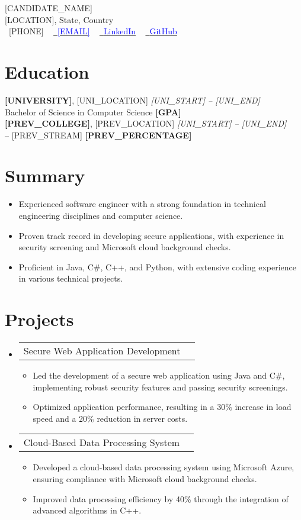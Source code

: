 \documentclass[letterpaper,10.5pt]{article}
\makeatletter
\newcommand{\resumeItem}[1]{\item\small{#1}}
\newcommand{\resumeProjectHeading}[2]{
    \item
    \begin{tabular*}{1.001\textwidth}{l@{\extracolsep{\fill}}r}
      \small#1 & \textbf{\small #2}\\
    \end{tabular*}
}
\newcommand{\resumeSubHeadingListStart}{\begin{itemize}[leftmargin=0.0in, label={}]}
\newcommand{\resumeSubHeadingListEnd}{\end{itemize}}
\newcommand{\resumeItemListStart}{\begin{itemize}[noitemsep,topsep=0pt,parsep=0pt,partopsep=0pt]}
\newcommand{\resumeItemListEnd}{\end{itemize}}
\makeatother
\begin{document}
\begin{center}
    {\Huge \scshape [CANDIDATE_NAME]} \\ \vspace{1pt}
    [LOCATION], State, Country \\ \vspace{1pt}
    \small \faPhone\ [PHONE] ~ 
    \href{mailto:[EMAIL]}{\faEnvelope\ \textcolor{blue}{[EMAIL]}} ~ 
    \href{[LINKEDIN_URL]}{\faLinkedin\ \textcolor{blue}{LinkedIn}} ~
    \href{[GITHUB_URL]}{\faGithub\ \textcolor{blue}{GitHub}}
\end{center}

\section*{Education}
\noindent
\textbf{[UNIVERSITY]}, [UNI_LOCATION] \hfill \textit{[UNI_START] -- [UNI_END]} \\
Bachelor of Science in Computer Science \hfill \textbf{[GPA]} \\[6pt]

\noindent
\textbf{[PREV_COLLEGE]}, [PREV_LOCATION] \hfill \textit{[UNI_START] -- [UNI_END]} \\
[PREV_DEGREE] – [PREV_STREAM] \hfill \textbf{[PREV_PERCENTAGE]}

\section{Summary}
\resumeItemListStart
    \resumeItem{Experienced software engineer with a strong foundation in technical engineering disciplines and computer science.}
    \resumeItem{Proven track record in developing secure applications, with experience in security screening and Microsoft cloud background checks.}
    \resumeItem{Proficient in Java, C#, C++, and Python, with extensive coding experience in various technical projects.}
\resumeItemListEnd

\section*{Projects}
\resumeSubHeadingListStart
\resumeProjectHeading{Secure Web Application Development}{}
\resumeItemListStart
    \resumeItem{Led the development of a secure web application using Java and C#, implementing robust security features and passing security screenings.}
    \resumeItem{Optimized application performance, resulting in a 30\% increase in load speed and a 20\% reduction in server costs.}
\resumeItemListEnd
\resumeProjectHeading{Cloud-Based Data Processing System}{}
\resumeItemListStart
    \resumeItem{Developed a cloud-based data processing system using Microsoft Azure, ensuring compliance with Microsoft cloud background checks.}
    \resumeItem{Improved data processing efficiency by 40\% through the integration of advanced algorithms in C++.}
\resumeItemListEnd
\resumeSubHeadingListEnd
\end{document}
